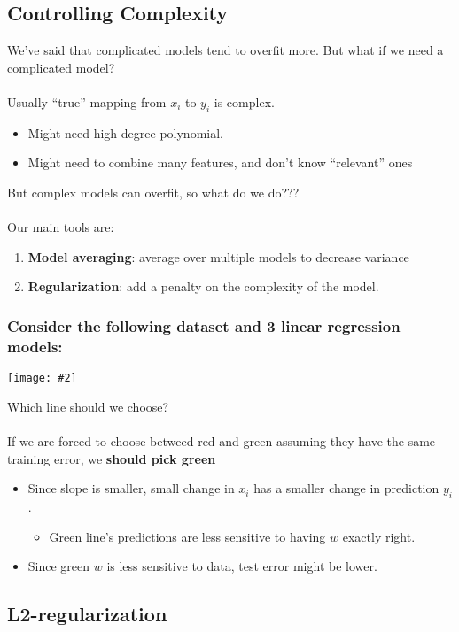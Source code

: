 \documentclass{article}
\def\blu#1{{\color{blu}#1}}
\def\gre#1{{\color{gre}#1}}
\def\red#1{{\color{red}#1}}
\newcommand{\centerfig}[2]{\begin{center}\texttt{[image: \#2]}\end{center}}
\begin{document}
\subsection*{Controlling Complexity}
We’ve said that \red{complicated models tend to overfit more}. But what if we need a complicated model? \\ \\
Usually \red{“true” mapping from $ x_i $ to $ y_i $ is complex.}
\begin{itemize}
	\item Might need high-degree polynomial.
	\item Might need to combine many features, and don’t know “relevant” ones
\end{itemize}
But complex models can overfit, so what do we do??? \\ \\
Our main tools are:
\begin{enumerate}
	\item \blu{\textbf{Model averaging}}: average over multiple models to decrease variance
	\item \blu{\textbf{Regularization}}: add a \gre{penalty on the complexity} of the model.
\end{enumerate}
\subsubsection*{Consider the following dataset and 3 linear regression models:}
\centerfig{0.5}{comp-pen-2}
Which line should we choose? \\ \\
If we are forced to choose betweed \red{red} and \gre{green} assuming they have the same training error, we \textbf{\gre{should pick green}}
\begin{itemize}
	\item Since slope is smaller, \gre{small change in $ x_i $ has a smaller change in prediction $ y_i $}.
	\begin{itemize}
		\item Green line’s predictions are \gre{less sensitive to having $ w $ exactly right}.
	\end{itemize}
	\item Since green $ w $ is less sensitive to data, test error might be lower.
\end{itemize}
 \subsection*{L2-regularization}
 
\end{document}
